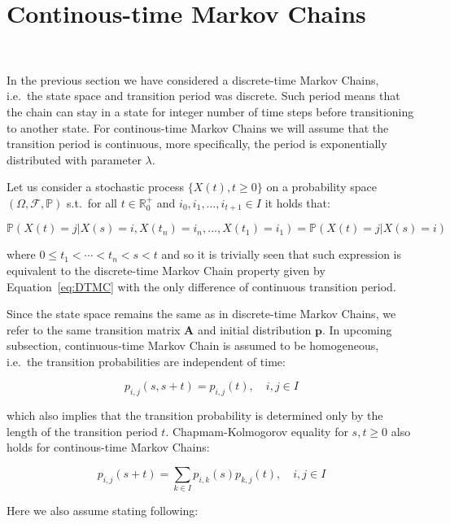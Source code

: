\section{Continous-time Markov Chains}~\label{sec:ctmc}

In the previous section we have considered a discrete-time Markov Chains, i.e.\ the state space and transition period was discrete. Such period means that 
the chain can stay in a state for integer number of time steps before transitioning to another state. 
For continous-time Markov Chains we will assume that the transition period is continuous, more specifically, the period is exponentially distributed with parameter $\lambda$.

Let us consider a stochastic process $\{X(t),t \geq 0\}$ on a probability space $(\Omega,\mathcal{F},\mathbb{P})$ s.t.\ for all $t \in \mathbb{R}_0^+$ and $i_0,i_1,\ldots,i_{t+1} \in I$ it holds that:

\begin{equation}
\mathbb{P}(X(t)=j|X(s)=i, X(t_n)=i_n,\ldots,X(t_1)=i_1) = \mathbb{P}(X(t)=j|X(s)=i)
\end{equation}

where $0 \leq t_1 < \cdots < t_n < s < t $ and so it is trivially seen that such expression is equivalent to the discrete-time Markov Chain property 
given by Equation~\ref{eq:DTMC} with the only difference of continuous transition period.~\citep{Tolver2016}

Since the state space remains the same as in discrete-time Markov Chains, we refer to the same transition matrix $\textbf{A}$ and initial distribution $\textbf{p}$.
In upcoming subsection, continuous-time Markov Chain is assumed to be homogeneous, i.e.\ the transition probabilities are independent of time:

\begin{equation}
p_{i,j}(s,s+t) = p_{i,j}(t), \quad i,j \in I
\end{equation}

which also implies that the transition probability is determined only by the length of the transition period $t$. 
Chapmam-Kolmogorov equality for $s,t \geq 0$ also holds for continous-time Markov Chains:

\begin{equation}
p_{i,j}(s+t) = \sum\limits_{k \in I} p_{i,k}(s) p_{k,j}(t), \quad i,j \in I
\end{equation}

Here we also assume \citep{Gallager2013} stating following:


